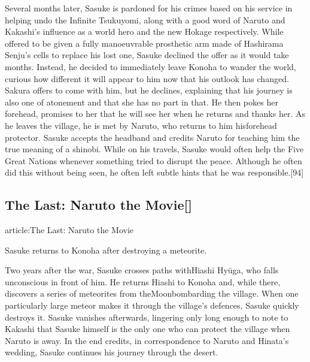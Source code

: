 \documentclass[a4paper,12pt]{article}
\begin{document}
Several months later, Sasuke is pardoned for his crimes based on his service in helping undo the Infinite Tsukuyomi, along with a good word of Naruto and Kakashi's influence as a world hero and the new Hokage respectively. While offered to be given a fully manoeuvrable prosthetic arm made of Hashirama Senju's cells to replace his lost one, Sasuke declined the offer as it would take months. Instead, he decided to immediately leave Konoha to wander the world, curious how different it will appear to him now that his outlook has changed. Sakura offers to come with him, but he declines, explaining that his journey is also one of atonement and that she has no part in that. He then pokes her forehead, promises to her that he will see her when he returns and thanks her. As he leaves the village, he is met by Naruto, who returns to him hisforehead protector. Sasuke accepts the headband and credits Naruto for teaching him the true meaning of a shinobi. While on his travels, Sasuke would often help the Five Great Nations whenever something tried to disrupt the peace. Although he often did this without being seen, he often left subtle hints that he was responsible.[94]\\ \par \vspace{0.5cm}

\subsection*{The Last: Naruto the Movie[]}\n\nMain article:The Last: Naruto the Movie\\ \par \vspace{0.5cm}

Sasuke returns to Konoha after destroying a meteorite.\\ \par \vspace{0.5cm}

Two years after the war, Sasuke crosses paths withHiashi Hyūga, who falls unconscious in front of him. He returns Hiashi to Konoha and, while there, discovers a series of meteorites from theMoonbombarding the village. When one particularly large meteor makes it through the village's defences, Sasuke quickly destroys it. Sasuke vanishes afterwards, lingering only long enough to note to Kakashi that Sasuke himself is the only one who can protect the village when Naruto is away. In the end credits, in correspondence to Naruto and Hinata's wedding, Sasuke continues his journey through the desert.\\ \par \vspace{0.5cm}
\end{document}
